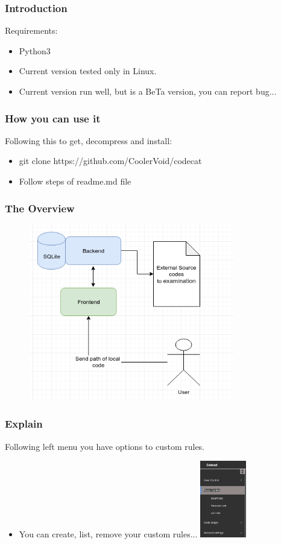 \documentclass[serif,mathserif]{beamer}
\begin{document}
\begin{frame}
  \frametitle{Introduction}
  Requirements:
  \begin{itemize}
  \item  Python3 
  \item  Current version tested only in Linux.
  \item  Current version run well, but is a BeTa version, you can report bug...
  \end{itemize}
\end{frame}


\begin{frame}
  \frametitle{How you can use it}
  Following this to get, decompress and install:
  \begin{itemize}
  \item git clone https://github.com/CoolerVoid/codecat
  \item Follow steps of readme.md file
  \end{itemize}
\end{frame}



\begin{frame}
  \frametitle{The Overview}
  \begin{figure}[]    
    \centering
    \includegraphics[width=9cm]{images/diagram0.png} 
  \end{figure}
\end{frame}


\begin{frame}
  \frametitle{Explain}
  Following left menu you have options to custom rules.
  \begin{itemize}
  \item You can create, list, remove your custom rules...
  \includegraphics[width=2cm]{images/menu1.png} 
  \end{itemize}
\end{frame}
\end{document}
